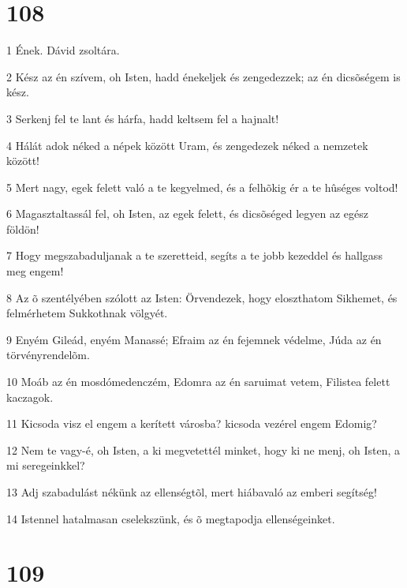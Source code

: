 \chapter{108}

\par 1 Ének. Dávid zsoltára.
\par 2 Kész az én szívem, oh Isten, hadd énekeljek és zengedezzek; az én dicsõségem is kész.
\par 3 Serkenj fel te lant és hárfa, hadd keltsem fel a hajnalt!
\par 4 Hálát adok néked a népek között Uram, és zengedezek néked a nemzetek között!
\par 5 Mert nagy, egek felett való a te kegyelmed, és a felhõkig ér a te hûséges voltod!
\par 6 Magasztaltassál fel, oh Isten, az egek felett, és dicsõséged legyen az egész földön!
\par 7 Hogy megszabaduljanak a te szeretteid, segíts a te jobb kezeddel és hallgass meg engem!
\par 8 Az õ szentélyében szólott az Isten: Örvendezek, hogy eloszthatom Sikhemet, és felmérhetem Sukkothnak völgyét.
\par 9 Enyém Gileád, enyém Manassé; Efraim az én fejemnek védelme, Júda az én törvényrendelõm.
\par 10 Moáb az én mosdómedenczém, Edomra az én saruimat vetem, Filistea felett kaczagok.
\par 11 Kicsoda visz el engem a kerített városba? kicsoda vezérel engem Edomig?
\par 12 Nem te vagy-é, oh Isten, a ki megvetettél minket, hogy ki ne menj, oh Isten, a mi seregeinkkel?
\par 13 Adj szabadulást nékünk az ellenségtõl, mert hiábavaló az emberi segítség!
\par 14 Istennel hatalmasan cselekszünk, és õ megtapodja ellenségeinket.

\chapter{109}

